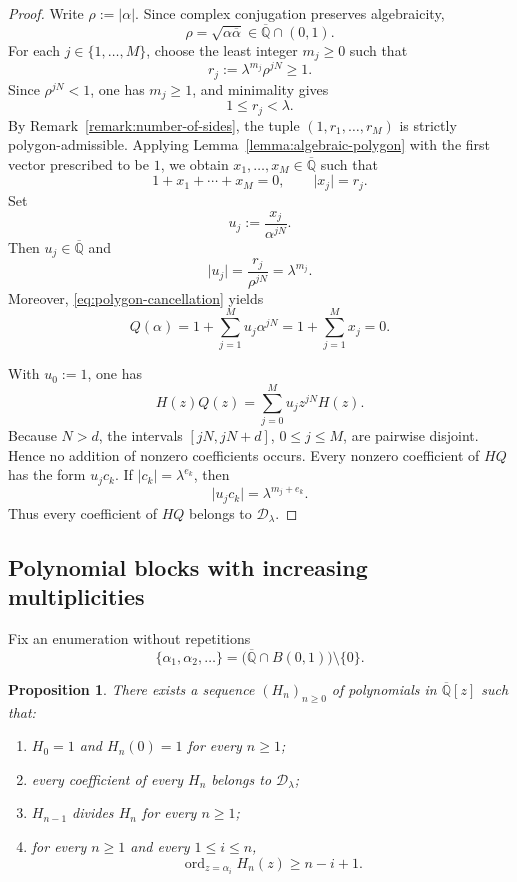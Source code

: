 \documentclass[10pt]{amsart}
\newtheorem{proposition}[theorem]{Proposition}
\theoremstyle{definition}
\theoremstyle{remark}
\numberwithin{equation}{section}
\newcommand{\Qbar}{\overline{\mathbb Q}}
\newcommand{\D}{\mathcal D}
\newcommand{\abs}[1]{\lvert #1\rvert}
\newcommand{\ord}{\operatorname{ord}}
\newcommand{\B}{B(0,1)}
\begin{document}
\begin{proof}
Write $\rho:=\abs\alpha$. Since complex conjugation preserves algebraicity,
\[
        \rho=\sqrt{\alpha\overline\alpha}\in\Qbar\cap(0,1).
\]
For each $j\in\{1,\ldots,M\}$, choose the least integer $m_j\geq0$ such that
\[
        r_j:=\lambda^{m_j}\rho^{jN}\geq1.
\]
Since $\rho^{jN}<1$, one has $m_j\geq1$, and minimality gives
\begin{equation}\label{eq:normalized-lengths}
        1\leq r_j<\lambda.
\end{equation}
By Remark~\ref{remark:number-of-sides}, the tuple
$(1,r_1,\ldots,r_M)$ is strictly polygon-admissible. Applying
Lemma~\ref{lemma:algebraic-polygon} with the first vector prescribed to be
$1$, we obtain $x_1,\ldots,x_M\in\Qbar$ such that
\begin{equation}\label{eq:polygon-cancellation}
        1+x_1+\cdots+x_M=0,
        \qquad
        \abs{x_j}=r_j.
\end{equation}
Set
\[
        u_j:=\frac{x_j}{\alpha^{jN}}.
\]
Then $u_j\in\Qbar$ and
\[
        \abs{u_j}=\frac{r_j}{\rho^{jN}}=\lambda^{m_j}.
\]
Moreover, \eqref{eq:polygon-cancellation} yields
\[
        Q(\alpha)
        =1+\sum_{j=1}^{M}u_j\alpha^{jN}
        =1+\sum_{j=1}^{M}x_j
        =0.
\]

With $u_0:=1$, one has
\[
        H(z)Q(z)=\sum_{j=0}^{M}u_jz^{jN}H(z).
\]
Because $N>d$, the intervals $[jN,jN+d]$, $0\leq j\leq M$, are pairwise
disjoint. Hence no addition of nonzero coefficients occurs. Every nonzero
coefficient of $HQ$ has the form $u_jc_k$. If
$\abs{c_k}=\lambda^{e_k}$, then
\[
        \abs{u_jc_k}=\lambda^{m_j+e_k}.
\]
Thus every coefficient of $HQ$ belongs to $\D_\lambda$.
\end{proof}

\subsection{Polynomial blocks with increasing multiplicities}

Fix an enumeration without repetitions
\begin{equation}\label{eq:enumeration}
        \{\alpha_1,\alpha_2,\ldots\}
        =\bigl(\Qbar\cap\B\bigr)\setminus\{0\}.
\end{equation}

\begin{proposition}\label{proposition:blocks}
There exists a sequence $(H_n)_{n\geq0}$ of polynomials in $\Qbar[z]$ such
that:
\begin{enumerate}[label=\textup{(\roman*)}]
\item $H_0=1$ and $H_n(0)=1$ for every $n\geq1$;
\item every coefficient of every $H_n$ belongs to $\D_\lambda$;
\item $H_{n-1}$ divides $H_n$ for every $n\geq1$;
\item for every $n\geq1$ and every $1\leq i\leq n$,
\begin{equation}\label{eq:multiplicity}
        \ord_{z=\alpha_i}H_n(z)\geq n-i+1.
\end{equation}
\end{enumerate}
\end{proposition}
\end{document}
